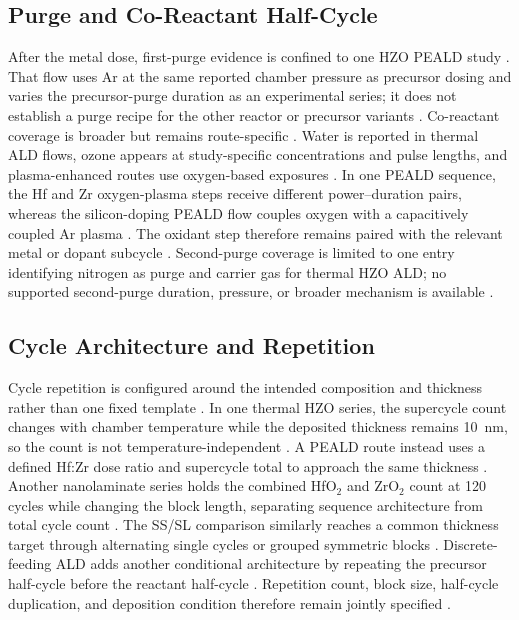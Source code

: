 \documentclass[11pt,a4paper]{report}
\begin{document}
\subsection{Purge and Co-Reactant Half-Cycle}

After the metal dose, first-purge evidence is confined to one HZO PEALD study \cite{choi2025purge}. That flow uses Ar at the same reported chamber pressure as precursor dosing and varies the precursor-purge duration as an experimental series; it does not establish a purge recipe for the other reactor or precursor variants \cite{choi2025purge}. Co-reactant coverage is broader but remains route-specific \cite{song2021ferro,schroeder2023road}. Water is reported in thermal ALD flows, ozone appears at study-specific concentrations and pulse lengths, and plasma-enhanced routes use oxygen-based exposures \cite{kim2020tin,kim2014inductive,neuber2022peald,kaatranen2026unif,choi2025purge,park2023seed,liu2025zrrich,kashir2021wake}. In one PEALD sequence, the Hf and Zr oxygen-plasma steps receive different power--duration pairs, whereas the silicon-doping PEALD flow couples oxygen with a capacitively coupled Ar plasma \cite{choi2025purge,neuber2022peald}. The oxidant step therefore remains paired with the relevant metal or dopant subcycle \cite{choi2025purge,neuber2022peald}. Second-purge coverage is limited to one entry identifying nitrogen as purge and carrier gas for thermal HZO ALD; no supported second-purge duration, pressure, or broader mechanism is available \cite{kim2014inductive}.
\subsection{Cycle Architecture and Repetition}

Cycle repetition is configured around the intended composition and thickness rather than one fixed template \cite{park2022chamber,choi2025purge,park2023seed,kaatranen2026unif}. In one thermal HZO series, the supercycle count changes with chamber temperature while the deposited thickness remains 10~nm, so the count is not temperature-independent \cite{park2022chamber}. A PEALD route instead uses a defined Hf:Zr dose ratio and supercycle total to approach the same thickness \cite{choi2025purge}. Another nanolaminate series holds the combined HfO$_2$ and ZrO$_2$ count at 120 cycles while changing the block length, separating sequence architecture from total cycle count \cite{park2023seed}. The SS/SL comparison similarly reaches a common thickness target through alternating single cycles or grouped symmetric blocks \cite{kaatranen2026unif}. Discrete-feeding ALD adds another conditional architecture by repeating the precursor half-cycle before the reactant half-cycle \cite{schroeder2023road}. Repetition count, block size, half-cycle duplication, and deposition condition therefore remain jointly specified \cite{schroeder2023road,park2022chamber,park2023seed}.
\end{document}

